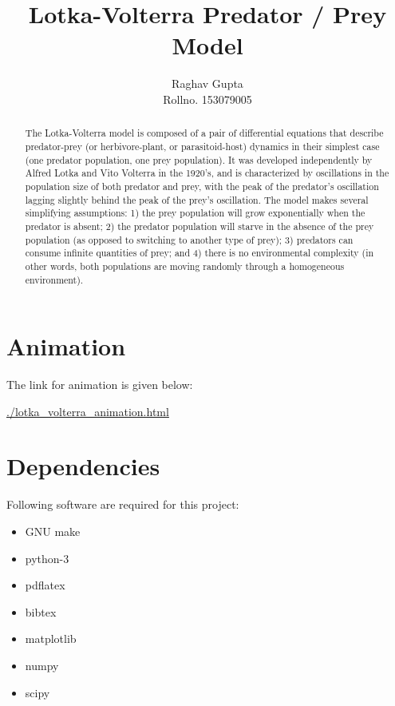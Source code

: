 \documentclass{article}
\title{Lotka-Volterra Predator / Prey Model}
\author{Raghav Gupta \\
	Rollno. 153079005}
\begin{document}


\maketitle
\newpage
\tableofcontents
\newpage
\listoffigures
\newpage

\begin{abstract}
The Lotka-Volterra model is composed of a pair of differential equations that describe predator-prey (or herbivore-plant, or parasitoid-host) dynamics in their simplest case (one predator population, one prey population). It was developed independently by Alfred Lotka and Vito Volterra in the 1920's, and is characterized by oscillations in the population size of both predator and prey, with the peak of the predator's oscillation lagging slightly behind the peak of the prey's oscillation. The model makes several simplifying assumptions: 1) the prey population will grow exponentially when the predator is absent; 2) the predator population will starve in the absence of the prey population (as opposed to switching to another type of prey); 3) predators can consume infinite quantities of prey; and 4) there is no environmental complexity (in other words, both populations are moving randomly through a homogeneous environment).
\end{abstract}

\newpage

\section{Animation}

The link for animation is given below:

\url{./lotka_volterra_animation.html}


\section{Dependencies}

Following software are required for this project:

\begin{itemize}

\item GNU make
\item python-3
\item pdflatex
\item bibtex
\item matplotlib
\item numpy
\item scipy

\end{itemize}
\end{document}
